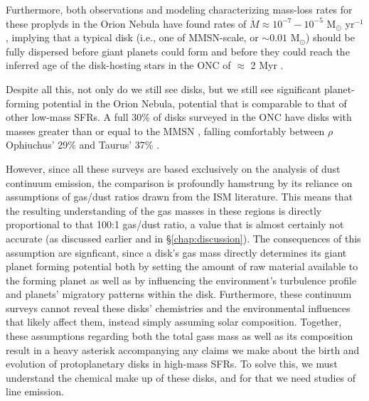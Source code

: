 Furthermore, both observations \citep{HenneyODell1999} and modeling \citep{Haworth2016} characterizing mass-loss rates for these proplyds in the Orion Nebula have found rates of $\dot{M} \approx 10^{-7}-10^{-5}$ M$_{\odot}$ yr$^{-1}$, implying that a typical disk (i.e., one of MMSN-scale, or $\sim0.01$ M$_{\odot}$) should be fully dispersed before giant planets could form \citep{Hubickyj2005} and before they could reach the inferred age of the disk-hosting stars in the ONC of $\approx$ 2 Myr \citep{Reggiani2011}.


  
Despite all this, not only do we still see disks, but we still see significant planet-forming potential in the Orion Nebula, potential that is comparable to that of other low-mass SFRs. A full 30\% of disks surveyed in the ONC have disks with masses greater than or equal to the MMSN \citep{Mann2014}, falling comfortably between $\rho$ Ophiuchus' 29\% \cite{AndrewsWilliams2005} and Taurus' 37\% \citep{AndrewsWilliams2007}.


However, since all these surveys are based exclusively on the analysis of dust continuum emission, the comparison is profoundly hamstrung by its reliance on assumptions of gas/dust ratios drawn from the ISM literature. This means that the resulting understanding of the gas masses in these regions is directly proportional to that 100:1 gas/dust ratio, a value that is almost certainly not accurate (as discussed earlier and in \S\ref{chap:discussion}). The consequences of this assumption are signficant, since a disk's gas mass directly determines its giant planet forming potential both by setting the amount of raw material available to the forming planet as well as by influencing the environment's turbulence profile and planets' migratory patterns within the disk. Furthermore, these continuum surveys cannot reveal these disks' chemistries and the environmental influences that likely affect them, instead simply assuming solar composition. Together, these assumptions regarding both the total gass mass as well as its composition result in a heavy asterisk accompanying any claims we make about the birth and evolution of protoplanetary disks in high-mass SFRs. To solve this, we must understand the chemical make up of these disks, and for that we need studies of line emission.




